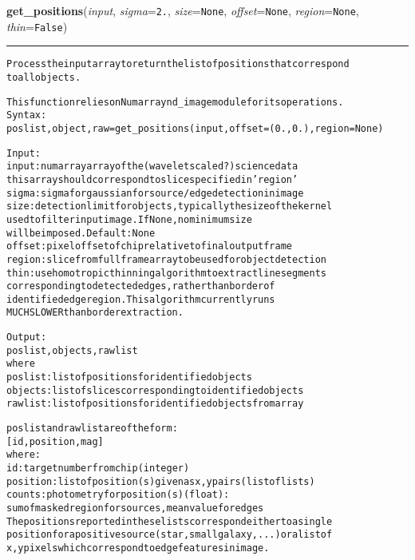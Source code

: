     \label{multireg:findobjects:get_positions}
    \vspace{0.5ex}

    \begin{boxedminipage}{\textwidth}

    \raggedright \textbf{get\_positions}(\textit{input}, \textit{sigma}=\texttt{2\-.\-}, \textit{size}=\texttt{N\-o\-n\-e\-}, \textit{offset}=\texttt{N\-o\-n\-e\-}, \textit{region}=\texttt{N\-o\-n\-e\-}, \textit{thin}=\texttt{F\-a\-l\-s\-e\-})

    \vspace{-1.5ex}

    \rule{\textwidth}{0.5\fboxrule}
\begin{alltt}
Process the input array to return the list of positions that correspond
to all objects.

This function relies on Numarray nd\_image module for its operations.
Syntax:
    poslist,object,raw = get\_positions(input,offset=(0.,0.),region=None)
    
Input: 
    input   :  numarray array of the (wavelet scaled?) science data
                this array should correspond to slice specified in 'region'
    sigma   : sigma for gaussian for source/edge detection in image
    size    :  detection limit for objects, typically the size of the kernel
                used to filter input image. If None, no minimum size
                will be imposed. Default: None
    offset  : pixel offset of chip relative to final output frame
    region  : slice from full frame array to be used for object detection
    thin    : use homotropic thinning algorithm to extract line segments 
                corresponding to detected edges, rather than border of 
                identified edge region. This algorithm currently runs
                MUCH SLOWER than border extraction.
            
Output:
    poslist,objects,rawlist
    where
        poslist: list of positions for identified objects
        objects: list of slices corresponding to identified objects
        rawlist: list of positions for identified objects from array
        
    poslist and rawlist are of the form:
        [id, position, mag]
    where:
        id      :  target number from chip (integer)
        position:  list of position(s) given as x,y pairs (list of lists)
        counts  :  photometry for position(s)(float): 
                    sum of masked region for sources, mean value for edges
    The positions reported in these lists correspond either to a single 
    position for a positive source (star,small galaxy,...) or a list of 
    x,y pixels which correspond to edge features in image.\end{alltt}

    \vspace{1ex}

    \end{boxedminipage}

